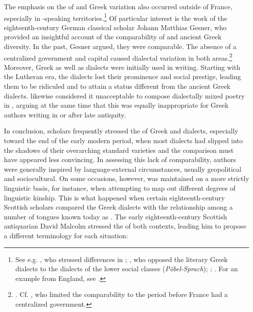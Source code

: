 The emphasis on the  of  and Greek variation also occurred outside of France, especially in -speaking territories.\footnote{See e.g. \citet[b.2\textsc{\textsuperscript{v}}\textsc{–}b.3\textsc{\textsuperscript{r}}]{Nibbe1725}, who stressed differences in ; \citet[1131--1132]{[frisch]1730}, who opposed the literary Greek dialects to the  dialects of the lower social classes (\textit{Pöbel-Sprach}); \citet[6--8]{[frederick1780}; \citet[203--204]{Ries1786}. For an example from England, see \citet[13--14]{Bayly1756}.} Of particular interest is the work of the eighteenth-century German classical scholar Johann Matthias Gesner, who provided an insightful account of the comparability of  and ancient Greek diversity. In the past, Gesner argued, they were comparable. The absence of a centralized government and capital caused dialectal variation in both areas.\footnote{\citet[160--161]{Gesner1774}. Cf. \citet[lxviii]{Court1778}, who limited the comparability to the period before France had a centralized government.} Moreover, Greek as well as  dialects were initially used in writing. Starting with the Lutheran era, the  dialects lost their prominence and social prestige, leading them to be ridiculed and to attain a status different from the ancient Greek dialects. \citet[162]{Gesner1774} likewise considered it unacceptable to compose dialectally mixed poetry in , arguing at the same time that this was equally inappropriate for Greek authors writing in or after late antiquity.

In conclusion, scholars frequently stressed the  of Greek and  dialects, especially toward the end of the early modern period, when most  dialects had slipped into the shadows of their overarching standard varieties and the comparison must have appeared less convincing. In assessing this lack of comparability, authors were generally inspired by language-external circumstances, usually geopolitical and sociocultural. On some occasions, however,  was maintained on a more strictly linguistic basis, for instance, when attempting to map out different degrees of linguistic kinship. This is what happened when certain eighteenth-century Scottish scholars compared the Greek dialects with the relationship among a number of tongues known today as . The early eighteenth-century Scottish antiquarian David Malcolm stressed the  of both contexts, leading him to propose a different terminology for each situation:

